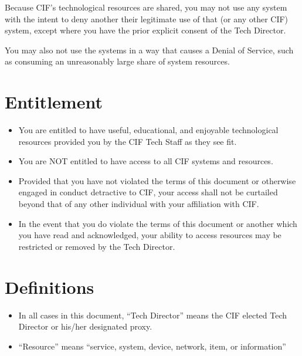 \documentclass[12pt]{article}
\begin{document}
Because CIF's technological resources are shared, you may not use any system with the intent to deny another their legitimate use of that (or any other CIF) system, except where you have the prior explicit consent of the Tech Director.

You may also not use the systems in a way that causes a Denial of Service, such as consuming an unreasonably large share of system resources.


\section{Entitlement} %

\begin{itemize}
	\item You are entitled to have useful, educational, and enjoyable technological resources provided you by the CIF Tech Staff as they see fit.
	\item You are NOT entitled to have access to all CIF systems and resources.
	\item Provided that you have not violated the terms of this document or otherwise engaged in conduct detractive to CIF, your access shall not be curtailed beyond that of any other individual with your affiliation with CIF.
	\item In the event that you do violate the terms of this document or another which you have read and acknowledged, your ability to access resources may be restricted or removed by the Tech Director.
\end{itemize}


\section{Definitions} %

\begin{itemize}
	\item In all cases in this document, “Tech Director” means the CIF elected Tech Director or his/her designated proxy.
	\item ``Resource'' means ``service, system, device, network, item, or information''
\end{itemize}

\end{document}

